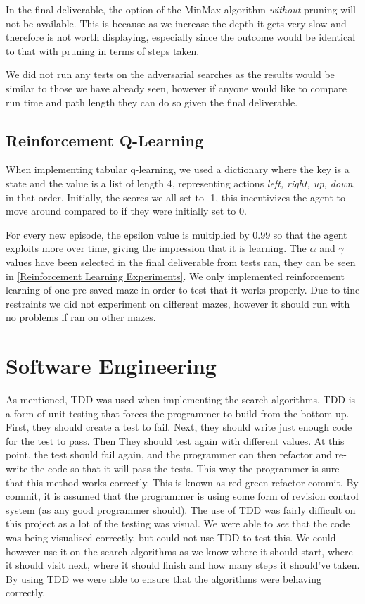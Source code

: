 \documentclass[]{final_report}
\begin{document}
In the final deliverable, the option of the MinMax algorithm \textit{without} pruning will not be available. This is because as we increase the depth it gets very slow and therefore is not worth displaying, especially since the outcome would be identical to that with pruning in terms of steps taken. 

We did not run any tests on the adversarial searches as the results would be similar to those we have already seen, however if anyone would like to compare run time and path length they can do so given the final deliverable.

\subsection{Reinforcement Q-Learning}

When implementing tabular q-learning, we used a dictionary where the key is a state and the value is a list of length 4, representing actions \textit{left, right, up, down}, in that order. Initially, the scores we all set to -1, this incentivizes the agent to move around compared to if they were initially set to 0. 

For every new episode, the epsilon value is multiplied by 0.99 so that the agent exploits more over time, giving the impression that it is learning. The $\alpha$ and $\gamma$ values have been selected in the final deliverable from tests ran, they can be seen in \ref{Reinforcement Learning Experiments}. We only implemented reinforcement learning of one pre-saved maze in order to test that it works properly. Due to tine restraints we did not experiment on different mazes, however it should run with no problems if ran on other mazes. 

\section{Software Engineering}

As mentioned, TDD was used when implementing the search algorithms. TDD is a form of unit testing that forces the programmer to build from the bottom up. First, they should create a test to fail. Next, they should write just enough code for the test to pass. Then They should test again with different values. At this point, the test should fail again, and the programmer can then refactor and re-write the code so that it will pass the tests. This way the programmer is sure that this method works correctly. This is known as red-green-refactor-commit. By commit, it is assumed that the programmer is using some form of revision control system (as any good programmer should). The use of TDD was fairly difficult on this project as a lot of the testing was visual. We were able to \textit{see} that the code was being visualised correctly, but could not use TDD to test this. We could however use it on the search algorithms as we know where it should start, where it should visit next, where it should finish and how many steps it should've taken. By using TDD we were able to ensure that the algorithms were behaving correctly. 
\end{document}
